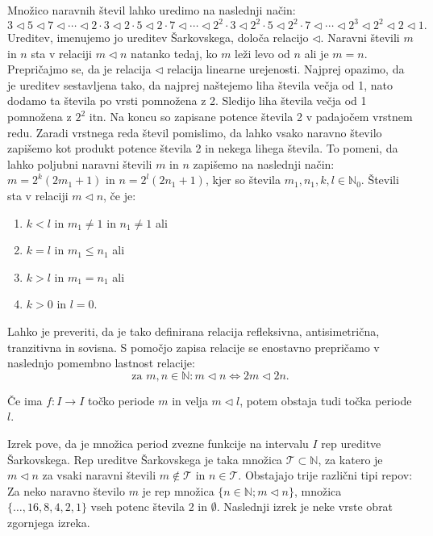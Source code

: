 \documentclass[mat2]{fmfdelo}
\newcommand{\N}{\mathbb N}
\begin{document}
\begin{definicija}
Množico naravnih števil lahko uredimo na naslednji način:
$$3 \triangleleft 5 \triangleleft 7 \triangleleft \cdots \triangleleft 2\cdot 3 \triangleleft 2\cdot 5 \triangleleft 2\cdot 7 \triangleleft \cdots \triangleleft 2^2\cdot 3 \triangleleft 2^2\cdot 5 \triangleleft 2^2\cdot 7 \triangleleft \cdots \triangleleft 2^3 \triangleleft 2^2 \triangleleft 2 \triangleleft 1.$$
Ureditev, imenujemo jo ureditev Šarkovskega, določa relacijo $\triangleleft$. Naravni števili $m$ in $n$ sta v relaciji $m\triangleleft n$ natanko tedaj, ko $m$ leži levo od $n$ ali je $m=n$. Prepričajmo se, da je relacija $\triangleleft$ relacija linearne urejenosti. Najprej opazimo, da je ureditev sestavljena tako, da najprej naštejemo liha števila večja od 1, nato dodamo ta števila po vrsti pomnožena z 2. Sledijo liha števila večja od 1 pomnožena z $2^2$ itn. Na koncu so zapisane potence števila 2 v padajočem vrstnem redu. Zaradi vrstnega reda števil pomislimo, da lahko vsako naravno število zapišemo kot produkt potence števila 2 in nekega lihega števila. To pomeni, da lahko poljubni naravni števili $m$ in $n$ zapišemo na naslednji način: $m= 2^k(2m_1 +1)$ in $n= 2^l(2n_1 +1)$, kjer so števila $m_1, n_1, k, l \in \N_0$. Števili sta v relaciji $m \triangleleft n$, če je:
\begin{enumerate}
\item $k<l$ in $m_1 \neq 1$ in $n_1 \neq 1$ ali
\item $k=l$ in $m_1 \leq n_1$ ali
\item $k>l$ in $m_1 = n_1$ ali
\item $k>0$ in $l =0$.
\end{enumerate}
Lahko je preveriti, da je tako definirana relacija refleksivna, antisimetrična, tranzitivna in sovisna.
S pomočjo zapisa relacije se enostavno prepričamo v naslednjo pomembno lastnost relacije:
$$\text{za } m, n \in \N: m \triangleleft n \Leftrightarrow 2m \triangleleft 2n.$$

\end{definicija}



\begin{izrek}\label{izr:forcing}
Če ima $f : I \to I$ točko periode $m$ in velja $ m \triangleleft l$, potem obstaja tudi točka periode $l$.
\end{izrek}
Izrek pove, da je množica period zvezne funkcije na intervalu $I$ rep ureditve Šarkovskega. Rep ureditve Šarkovskega je taka množica $\mathcal{T} \subset \N$, za katero je $m \triangleleft n$ za  vsaki naravni števili $m \notin \mathcal{T}$ in $n \in \mathcal{T}$. Obstajajo trije različni tipi repov:  Za neko naravno število $m$ je rep množica $\{n \in \N; m \triangleleft n\}$, množica $\{\dots, 16, 8, 4, 2, 1\}$ vseh potenc števila 2 in $\emptyset$.
Naslednji izrek je neke vrste obrat zgornjega izreka.
\end{document}
